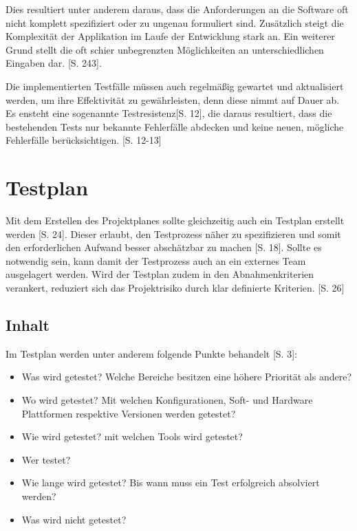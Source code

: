 \documentclass[a4paper,bibtotoc,oneside]{scrbook}
\begin{document}
Dies resultiert unter anderem daraus, dass die Anforderungen an die Software oft nicht komplett spezifiziert oder zu ungenau formuliert sind. Zusätzlich steigt die Komplexität der Applikation im Laufe der Entwicklung stark an. Ein weiterer Grund stellt die oft schier unbegrenzten Möglichkeiten an unterschiedlichen Eingaben dar. \cite{software_qual}[S. 243].

Die implementierten Testfälle müssen auch regelmäßig gewartet und aktualisiert werden, um ihre Effektivität zu gewährleisten, denn diese nimmt auf Dauer ab. Es ensteht eine sogenannte \glqq Testresistenz\grqq\cite{eval_regression}[S. 12], die daraus resultiert, dass die bestehenden Tests nur bekannte Fehlerfälle abdecken und keine neuen, mögliche Fehlerfälle berücksichtigen. \cite{eval_regression}[S. 12-13]

\chapter{Testplan}

Mit dem Erstellen des Projektplanes sollte gleichzeitig auch ein Testplan erstellt werden \cite{eval_automat_webapp_test}[S. 24]. Dieser erlaubt, den Testprozess näher zu spezifizieren und somit den erforderlichen Aufwand besser abschätzbar zu machen \cite{test_large_systems}[S. 18]. Sollte es notwendig sein, kann damit der Testprozess auch an ein externes Team ausgelagert werden. Wird der Testplan zudem in den Abnahmenkriterien verankert, reduziert sich das Projektrisiko durch klar definierte Kriterien. \cite{eval_automat_webapp_test}[S. 26]

\section{Inhalt}
Im Testplan werden unter anderem folgende Punkte behandelt \cite{test_auto}[S. 3]:

\begin{itemize}
	\item Was wird getestet? Welche Bereiche besitzen eine höhere Priorität als andere?
	\item Wo wird getestet? Mit welchen Konfigurationen, Soft- und Hardware Plattformen respektive Versionen werden getestet?
	\item Wie wird getestet? mit welchen Tools wird getestet?
	\item Wer testet?
	\item Wie lange wird getestet? Bis wann muss ein Test erfolgreich absolviert werden?
	\item Was wird nicht getestet?
\end{itemize}
\end{document}
